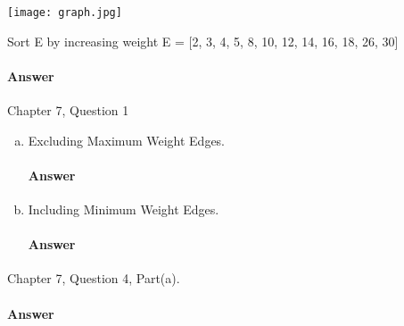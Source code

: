 \documentclass{article}
\begin{document}
\texttt{[image: graph.jpg]}

\begin{algorithmic}
\State Sort E by increasing weight
\State E = [2, 3, 4, 5, 8, 10, 12, 14, 16, 18, 26, 30]
\EndFunction
\end{algorithmic}

\paragraph{Answer}
\todo{}

\collab{\todo{}}

Chapter 7, Question 1

\begin{enumerate}[(a)]

    \item Excluding Maximum Weight Edges.

        \paragraph{Answer}
        \todo{}


    \item Including Minimum Weight Edges.

        \paragraph{Answer}
        \todo{}

\end{enumerate}


\collab{\todo{}}

Chapter 7, Question 4, Part(a).

\paragraph{Answer}
\todo{}
\end{document}
